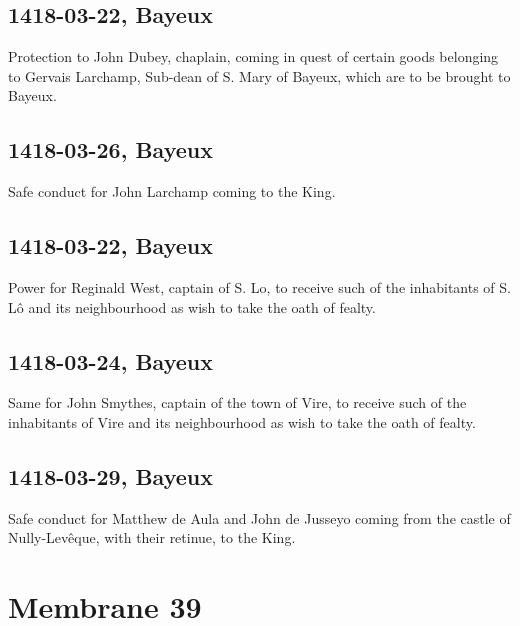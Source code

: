 \documentclass[a4paper,12pt,twoside]{book}
\begin{document}
            \subsection{1418-03-22, Bayeux}
            
                     Protection to John Dubey, chaplain, coming in quest of certain goods belonging to Gervais Larchamp, Sub-dean of S. Mary of Bayeux, which are to be brought to Bayeux.
                  
            \subsection{1418-03-26, Bayeux}
            
                     Safe conduct for John Larchamp coming to the King.
                  
            \subsection{1418-03-22, Bayeux}
            
                     Power for Reginald West, captain of S. Lo, to receive such of the inhabitants of S. Lô and its neighbourhood as wish to take the oath of fealty.
                  
            \subsection{1418-03-24, Bayeux}
            
                     Same for John Smythes, captain of the town of Vire, to receive such of the inhabitants of Vire and its neighbourhood as wish to take the oath of fealty.
                  
            \subsection{1418-03-29, Bayeux}
            
                     Safe conduct for Matthew de Aula and John de Jusseyo coming from the castle of Nully-Levêque, with their retinue, to the King.
                  
            \newpage
        
        \section{Membrane 39}
        
\end{document}
